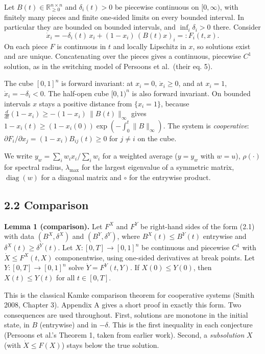 \documentclass[
  11pt,
  a4paper,
]{article}
\begin{document}
Let \(B(t)\in\mathbb R^{n\times n}_{\ge0}\) and \(\delta_i(t)>0\) be
piecewise continuous on \([0,\infty)\), with finitely many pieces and
finite one-sided limits on every bounded interval. In particular they
are bounded on bounded intervals, and \(\inf_i\delta_i>0\) there.
Consider \[
\dot x_i=-\delta_i(t)\,x_i+(1-x_i)\,(B(t)x)_i=:F_i(t,x). \tag{2.1}
\] On each piece \(F\) is continuous in \(t\) and locally Lipschitz in
\(x\), so solutions exist and are unique. Concatenating over the pieces
gives a continuous, piecewise \(C^1\) solution, as in the switching
model of Persoons et al.~(their eq. 5).

The cube \([0,1]^n\) is forward invariant: at \(x_i=0\),
\(\dot x_i\ge0\), and at \(x_i=1\), \(\dot x_i=-\delta_i<0\). The
half-open cube \([0,1)^n\) is also forward invariant. On bounded
intervals \(x\) stays a positive distance from \(\{x_i=1\}\), because
\(\frac{d}{dt}(1-x_i)\ge-(1-x_i)\,\|B(t)\|_\infty\) gives
\(1-x_i(t)\ge(1-x_i(0))\exp(-\int_0^t\|B\|_\infty)\). The system is
\emph{cooperative}: \(\partial F_i/\partial x_j=(1-x_i)B_{ij}(t)\ge0\)
for \(j\neq i\) on the cube.

We write \(y_w=\sum_iw_ix_i/\sum_iw_i\) for a weighted average
(\(y=y_w\) with \(w=u\)), \(\rho(\cdot)\) for spectral radius,
\(\lambda_{\max}\) for the largest eigenvalue of a symmetric matrix,
\(\operatorname{diag}(w)\) for a diagonal matrix and \(\circ\) for the
entrywise product.

\subsection{2.2 Comparison}\label{comparison}

\textbf{Lemma 1 (comparison).} Let \(F^X\) and \(F^Y\) be right-hand
sides of the form (2.1) with data \((B^X,\delta^X)\) and
\((B^Y,\delta^Y)\), where \(B^X(t)\le B^Y(t)\) entrywise and
\(\delta^X(t)\ge\delta^Y(t)\). Let \(X:[0,T]\to[0,1]^n\) be continuous
and piecewise \(C^1\) with \(\dot X\le F^X(t,X)\) componentwise, using
one-sided derivatives at break points. Let \(Y:[0,T]\to[0,1]^n\) solve
\(\dot Y=F^Y(t,Y)\). If \(X(0)\le Y(0)\), then \(X(t)\le Y(t)\) for all
\(t\in[0,T]\).

This is the classical Kamke comparison theorem for cooperative systems
(Smith 2008, Chapter 3). Appendix A gives a short proof in exactly this
form. Two consequences are used throughout. First, solutions are
monotone in the initial state, in \(B\) (entrywise) and in \(-\delta\).
This is the first inequality in each conjecture (Persoons et al.'s
Theorem 1, taken from earlier work). Second, a \emph{subsolution} \(X\)
(with \(\dot X\le F(X)\)) stays below the true solution.
\end{document}
